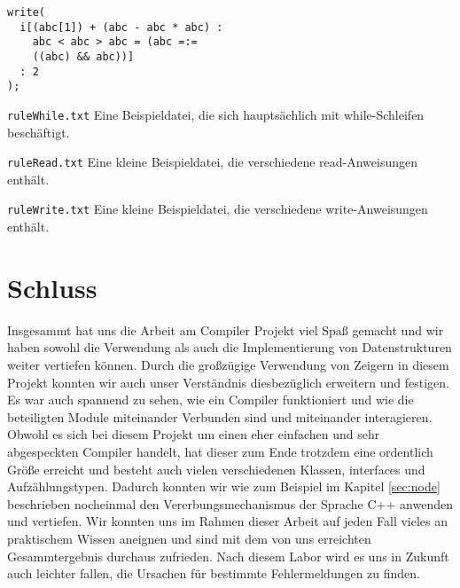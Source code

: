 \documentclass[
a4paper,   %
11pt,      %
oneside,   %
onecolumn, %
final      %
]{article}
\begin{document}
\begin{description}
\begin{lstlisting}[language=SysProgLang, caption={ruleBrackets.txt}, label=lst:testBrackets]
write(
  i[(abc[1]) + (abc - abc * abc) : 
    abc < abc > abc = (abc =:=
    ((abc) && abc))]
  : 2
);
\end{lstlisting}

\item{\texttt{ruleWhile.txt}} Eine Beispieldatei, die sich hauptsächlich mit while-Schleifen beschäftigt.

\item{\texttt{ruleRead.txt}} Eine kleine Beispieldatei, die verschiedene read-Anweisungen enthält. 

\item{\texttt{ruleWrite.txt}} Eine kleine Beispieldatei, die verschiedene write-Anweisungen enthält.
\end{description}

\section{Schluss}
Insgesammt hat uns die Arbeit am Compiler Projekt viel Spaß gemacht und wir haben sowohl die Verwendung als auch die Implementierung von Datenstrukturen weiter vertiefen können. Durch die großzügige Verwendung von Zeigern in diesem Projekt konnten wir auch unser Verständnis diesbezüglich erweitern und festigen. Es war auch spannend zu sehen, wie ein Compiler funktioniert und wie die beteiligten Module miteinander Verbunden sind und miteinander interagieren. Obwohl es sich bei diesem Projekt um einen eher einfachen und sehr abgespeckten Compiler handelt, hat dieser zum Ende trotzdem eine ordentlich Größe erreicht und besteht auch vielen verschiedenen Klassen, interfaces und Aufzählungstypen. Dadurch konnten wir wie zum Beispiel im Kapitel \ref{sec:node} beschrieben nocheinmal den Vererbungsmechanismus der Sprache C++ anwenden und vertiefen. Wir konnten uns im Rahmen dieser Arbeit auf jeden Fall vieles an praktischem Wissen aneignen und sind mit dem von uns erreichten Gesammtergebnis durchaus zufrieden. Nach diesem Labor wird es uns in Zukunft auch leichter fallen, die Ursachen für bestimmte Fehlermeldungen zu finden.
\end{document}
